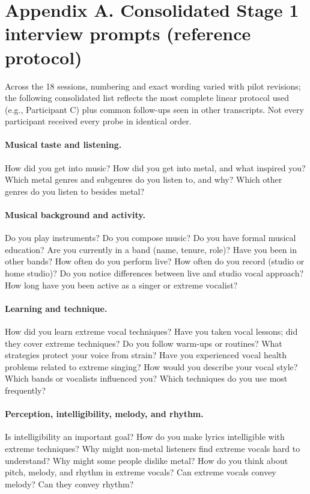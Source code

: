 \section*{Appendix A. Consolidated Stage 1 interview prompts (reference protocol)}
\label{app:stage1}

Across the 18 sessions, numbering and exact wording varied with pilot revisions; the following consolidated list reflects the most complete linear protocol used (e.g., Participant C) plus common follow-ups seen in other transcripts. Not every participant received every probe in identical order.

\paragraph{Musical taste and listening.}
How did you get into music? How did you get into metal, and what inspired you? Which metal genres and subgenres do you listen to, and why? Which other genres do you listen to besides metal?

\paragraph{Musical background and activity.}
Do you play instruments? Do you compose music? Do you have formal musical education? Are you currently in a band (name, tenure, role)? Have you been in other bands? How often do you perform live? How often do you record (studio or home studio)? Do you notice differences between live and studio vocal approach? How long have you been active as a singer or extreme vocalist?

\paragraph{Learning and technique.}
How did you learn extreme vocal techniques? Have you taken vocal lessons; did they cover extreme techniques? Do you follow warm-ups or routines? What strategies protect your voice from strain? Have you experienced vocal health problems related to extreme singing? How would you describe your vocal style? Which bands or vocalists influenced you? Which techniques do you use most frequently?

\paragraph{Perception, intelligibility, melody, and rhythm.}
Is intelligibility an important goal? How do you make lyrics intelligible with extreme techniques? Why might non-metal listeners find extreme vocals hard to understand? Why might some people dislike metal? How do you think about pitch, melody, and rhythm in extreme vocals? Can extreme vocals convey melody? Can they convey rhythm?


